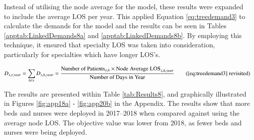 \documentclass[../thesis.tex]{subfiles}
\begin{document}
Instead of utilising the node average for the model, these results were expanded to include the average LOS per year. This applied Equation \eqref{eq:treedemand3} to calculate the demands for the model and the results can be seen in Tables \ref{apptab:LinkedDemands8a} and \ref{apptab:LinkedDemands8b}. By employing this technique, it ensured that specialty LOS was taken into consideration, particularly for specialties which have longer LOS's.

\begin{equation}
        D_{s,r,year} = \sum\limits_{h \in r} D_{s,h,year} = \frac{\text{Number of Patients}_{s,h}\times\text{Node Average LOS}_{s,h,year}}{\text{Number of Days in Year}} \tag{\ref{eq:treedemand3} revisited}
\end{equation}

The results are presented within Table \ref{tab:Results8}, and graphically illustrated in Figures \ref{fig:app18a} - 
 \ref{fig:app20b} in the Appendix. The results show that more beds and nurses were deployed in 2017–2018 when compared against using the average node LOS. The objective value was lower from 2018, as fewer beds and nurses were being deployed.
\end{document}
